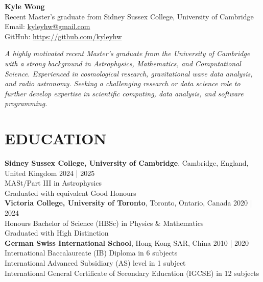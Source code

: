 \documentclass[a4paper,10pt]{extarticle}
\begin{document}
\pagestyle{fancy}
\renewcommand{\headrulewidth}{0pt}
\fancyhead{}
\fancyhead[R]{\textit{\monthyeardate\today}}
\thispagestyle{empty} %

\begin{flushleft}
\textbf{\LARGE Kyle Wong}\\[0.5em] %
Recent Master's graduate from Sidney Sussex College, University of Cambridge
\\ Email: \href{mailto:kyleyhw@gmail.com}{kyleyhw@gmail.com} %
\\ GitHub: \url{https://github.com/kyleyhw}

\vspace{1em}
\textit{A highly motivated recent Master's graduate from the University of Cambridge with a strong background in Astrophysics, Mathematics, and Computational Science. Experienced in cosmological research, gravitational wave data analysis, and radio astronomy. Seeking a challenging research or data science role to further develop expertise in scientific computing, data analysis, and software programming.}
\end{flushleft}

\section*{EDUCATION}
\textbf{Sidney Sussex College, University of Cambridge}, Cambridge, England, United Kingdom \hfill 2024 | 2025\\
MASt/Part III in Astrophysics\\
Graduated with equivalent Good Honours\\



\textbf{Victoria College, University of Toronto}, Toronto, Ontario, Canada \hfill 2020 | 2024\\ %
Honours Bachelor of Science (HBSc) in Physics \& Mathematics\\
Graduated with High Distinction\\


\textbf{German Swiss International School}, Hong Kong SAR, China \hfill 2010 | 2020\\ %
International Baccalaureate (IB) Diploma in 6 subjects\\
International Advanced Subsidiary (AS) level in 1 subject\\
International General Certificate of Secondary Education (IGCSE) in 12 subjects
\end{document}

